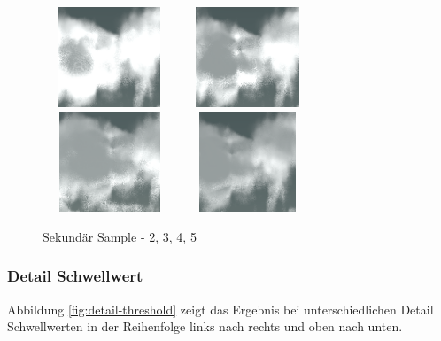 \begin{figure}[H]
    \centering
    \includegraphics[width=4cm, height=3cm]{figures/2nd-sample/2nd-sample-2.png}
    \includegraphics[width=4cm, height=3cm]{figures/2nd-sample/2nd-sample-3.png}
    \includegraphics[width=4cm, height=3cm]{figures/2nd-sample/2nd-sample-4.png}
    \includegraphics[width=4cm, height=3cm]{figures/2nd-sample/2nd-sample-5.png}
    \caption{Sekundär Sample - 2, 3, 4, 5}
    \label{fig:2nd-sample}
\end{figure}

\subsubsection{Detail Schwellwert}
Abbildung \ref{fig:detail-threshold} zeigt das Ergebnis bei unterschiedlichen Detail Schwellwerten in der Reihenfolge links nach rechts und oben nach unten.

